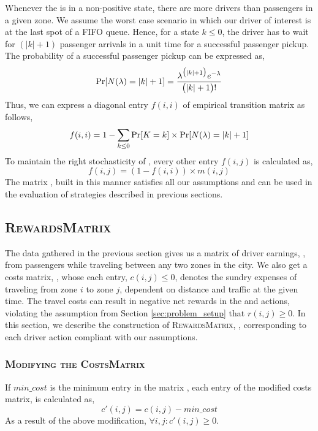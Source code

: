Whenever the {\markovchain} is in a non-positive state, there are more drivers than passengers in a given zone. We assume the worst case scenario in which our driver of interest is at the last spot of a FIFO queue. Hence, for a state $k \leq 0$, the driver has to wait for $(|k| + 1)$ passenger arrivals in a unit time for a successful passenger pickup. The probability of a successful passenger pickup can be expressed as,
\begin{equation}
\Pr[N(\lambda) = |k| + 1] = \frac{\lambda^{\big(|k|+1\big)} e^{-\lambda}}{\big(|k| + 1\big)!}
\end{equation}
Thus, we can express a diagonal entry $f(i,i)$ of empirical transition matrix as follows,
\begin{equation}
f(i,i) = 1 - \sum_{k \leq 0} \Pr[K = k] \times \Pr[N(\lambda) = |k| + 1]
\end{equation}
To maintain the right stochasticity of {\empiricaltransitionmatrix}, every other entry $f(i,j)$ is calculated as,
\begin{equation}
f(i,j) = (1 - f(i,i)) \times m(i,j)
\end{equation}
The matrix {\empiricaltransitionmatrix}, built in this manner satisfies all our assumptions and can be used in the evaluation of strategies described in previous sections.

\subsection{\textsc{RewardsMatrix}}

The data gathered in the previous section gives us a matrix of driver earnings, , from passengers while traveling between any two zones in the city. We also get a costs matrix, , whose each entry, $c(i,j) \leq 0$, denotes the sundry expenses of traveling from zone $i$ to zone $j$, dependent on distance and traffic at the given time. The travel costs can result in negative net rewards in the {\gohome} and {\relocate} actions, violating the assumption from Section \ref{sec:problem_setup} that $r(i,j) \geq 0$. In this section, we describe the construction of \textsc{RewardsMatrix}, {\rewardsmatrix}, corresponding to each driver action compliant with our assumptions.

\subsubsection{\textsc{Modifying the CostsMatrix}}
If $min\_cost$ is the minimum entry in the matrix , each entry of the modified costs matrix,  is calculated as,
\begin{equation}
c'(i,j) = c(i,j) - min\_cost
\end{equation}
As a result of the above modification, $\forall i,j : c'(i,j) \geq 0$.

